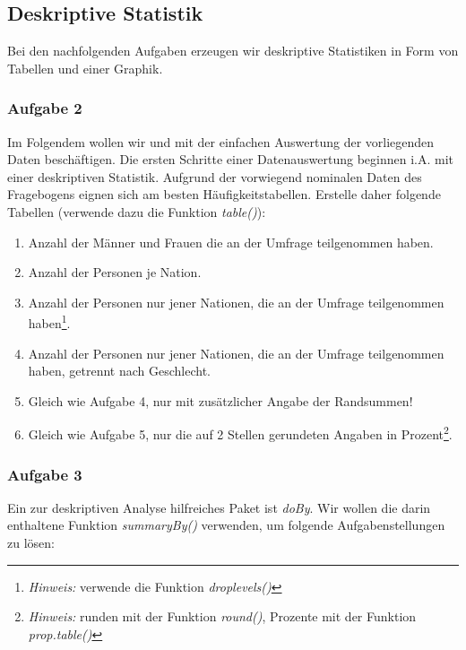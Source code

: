 \documentclass[]{article}
\providecommand{\tightlist}{%
  \setlength{\itemsep}{0pt}\setlength{\parskip}{0pt}}
\let\rmarkdownfootnote\footnote%
\def\footnote{\protect\rmarkdownfootnote}
\begin{document}
\subsection*{Deskriptive Statistik}\label{deskriptive-statistik}

Bei den nachfolgenden Aufgaben erzeugen wir deskriptive Statistiken in
Form von Tabellen und einer Graphik.

\hypertarget{aufgabe-2}{\subsubsection*{Aufgabe 2}\label{aufgabe-2}}

Im Folgendem wollen wir und mit der einfachen Auswertung der
vorliegenden Daten beschäftigen. Die ersten Schritte einer
Datenauswertung beginnen i.A. mit einer deskriptiven Statistik. Aufgrund
der vorwiegend nominalen Daten des Fragebogens eignen sich am besten
Häufigkeitstabellen. Erstelle daher folgende Tabellen (verwende dazu die
Funktion \emph{table()}):

\begin{enumerate}
\def\labelenumi{\arabic{enumi}.}
\tightlist
\item
  Anzahl der Männer und Frauen die an der Umfrage teilgenommen haben.
\item
  Anzahl der Personen je Nation.
\item
  Anzahl der Personen nur jener Nationen, die an der Umfrage
  teilgenommen haben\footnote{\emph{Hinweis:} verwende die Funktion
    \emph{droplevels()}}.
\item
  Anzahl der Personen nur jener Nationen, die an der Umfrage
  teilgenommen haben, getrennt nach Geschlecht.
\item
  Gleich wie Aufgabe 4, nur mit zusätzlicher Angabe der Randsummen!
\item
  Gleich wie Aufgabe 5, nur die auf 2 Stellen gerundeten Angaben in
  Prozent\footnote{\emph{Hinweis:} runden mit der Funktion
    \emph{round()}, Prozente mit der Funktion \emph{prop.table()}}.
\end{enumerate}

\subsubsection*{Aufgabe 3}\label{aufgabe-3}

Ein zur deskriptiven Analyse hilfreiches Paket ist \emph{doBy}. Wir
wollen die darin enthaltene Funktion \emph{summaryBy()} verwenden, um
folgende Aufgabenstellungen zu lösen:
\end{document}
